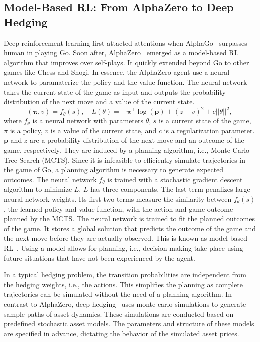 \subsection{Model-Based RL: From AlphaZero to Deep Hedging}
Deep reinforcement learning first attacted attentions when AlphaGo~\citep{silver2016mastering} surpasses human in playing Go. 
Soon after, AlphaZero~\citep{silver2016mastering} emerged as a model-based RL algorithm that improves over self-plays.
It quickly extended beyond Go to other games like Chess and Shogi.
In essence, the AlphaZero agent use a neural network to paramaterize the policy and the value function.
The neural network takes the current state of the game as input and outputs the probability distribution of the next move and a value of the current state.
\begin{equation}
    (\mathbf{\pi}, v) = f_{\theta}(s), \quad L(\theta) = - \mathbf{\pi}^{\intercal} \log(\mathbf{p}) + (z - v)^2  + c||\theta||^2,
\end{equation}
where $f_{\theta}$ is a neural network with parameters $\theta$, $s$ is a current state of the game, $\pi$ is a policy, $v$ is a value of the current state, and $c$ is a regularization parameter.
$\mathbf{p}$ and $z$ are a probability distribution of the next move and an outcome of the game, respectively.
They are induced by a planning algorithm, i.e., Monte Carlo Tree Search (MCTS).
Since it is infeasible to efficiently simulate trajectories in the game of Go, a planning algorithm is necessary to generate expected outcomes.
The neural network $f_{\theta}$ is trained with a stochastic gradient descent algorithm to minimize $L$.
$L$ has three components.
The last term penalizes large neural network weights.
Its first two terms measure the similarity between $f_{\theta}(s)$, the learned policy and value function, with the action and game outcome planned by the MCTS.
The neural network is trained to fit the planned outcomes of the game.
It stores a global solution that predicts the outcome of the game and the next move before they are actually observed.
This is known as model-based RL~\citep{sutton2018reinforcement}.
Using a model allows for planning, i.e., decision-making take place using future situations that have not been experienced by the agent.

In a typical hedging problem, the transition probabilities are independent from the hedging weights, i.e., the actions.
This simplifies the planning as complete trajectories can be simulated without the need of a planning algorithm.
In contrast to AlphaZero, deep hedging~\citep{buehler2019deep} uses monte carlo simulations to generate sample paths of asset dynamics.
These simulations are conducted based on predefined stochastic asset models. 
The parameters and structure of these models are specified in advance, dictating the behavior of the simulated asset prices.

